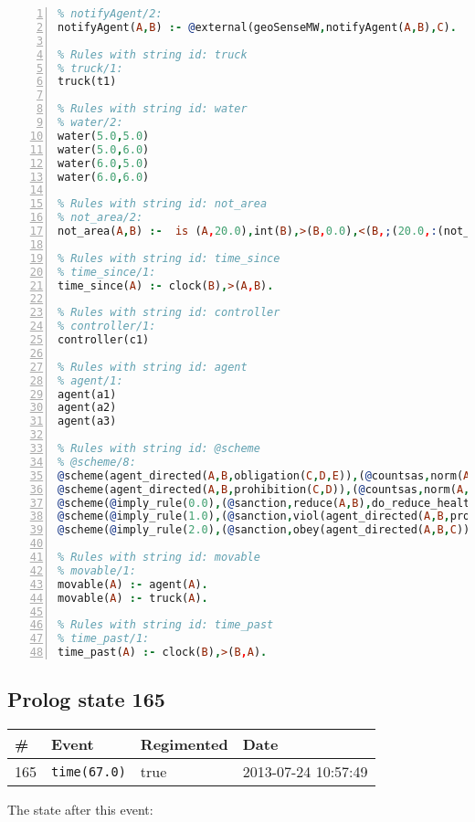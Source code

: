 \documentclass[11pt]{article}\usepackage[utf8]{inputenc}\usepackage{geometry}
\begin{document}
\begin{lstlisting}[language=Prolog, numbers=left]
% Rules with string id: notifyAgent
% notifyAgent/2:
notifyAgent(A,B) :- @external(geoSenseMW,notifyAgent(A,B),C).

% Rules with string id: truck
% truck/1:
truck(t1)

% Rules with string id: water
% water/2:
water(5.0,5.0)
water(5.0,6.0)
water(6.0,5.0)
water(6.0,6.0)

% Rules with string id: not_area
% not_area/2:
not_area(A,B) :-  is (A,20.0),int(B),>(B,0.0),<(B,;(20.0,:(not_area(A,B), is (-(B),20.0)))),int(A),>(A,0.0),<(A,;(20.0,:(area(A,B),-(int(A))))),int(B),>(A,0.0),>(B,0.0),<(A,21.0),<(B,21.0).

% Rules with string id: time_since
% time_since/1:
time_since(A) :- clock(B),>(A,B).

% Rules with string id: controller
% controller/1:
controller(c1)

% Rules with string id: agent
% agent/1:
agent(a1)
agent(a2)
agent(a3)

% Rules with string id: @scheme
% @scheme/8:
@scheme(agent_directed(A,B,obligation(C,D,E)),(@countsas,norm(A,B,F,obligation(C,D,E)),F),false,(listTrue(C)),(time_past(D)),false,[plus(viol(agent_directed(A,B,obligation(C,D,E))))|[]],[plus(obey(agent_directed(A,B,obligation(C,D,E))))|[]])
@scheme(agent_directed(A,B,prohibition(C,D)),(@countsas,norm(A,B,E,prohibition(C,D)),E),(listTrue(C)),false,(false),false,[plus(viol(agent_directed(A,B,prohibition(C,D))))|[]],[plus(obey(agent_directed(A,B,prohibition(C,D))))|[]])
@scheme(@imply_rule(0.0),(@sanction,reduce(A,B),do_reduce_health(A,B),notifyAgent(A,changed(status))),true,false,false,false,[min(reduce(A,B))|[]],[])
@scheme(@imply_rule(1.0),(@sanction,viol(agent_directed(A,B,prohibition(C,D))),do_sanction(D)),true,false,false,false,[min(viol(agent_directed(A,B,prohibition(C,D))))|[]],[])
@scheme(@imply_rule(2.0),(@sanction,obey(agent_directed(A,B,C))),true,false,false,false,[min(obey(agent_directed(A,B,C)))|[]],[])

% Rules with string id: movable
% movable/1:
movable(A) :- agent(A).
movable(A) :- truck(A).

% Rules with string id: time_past
% time_past/1:
time_past(A) :- clock(B),>(B,A).

\end{lstlisting}
\clearpage 
\subsection{Prolog state 165}
\begin{table}[ht]
\centering 
\begin{tabular}{l l l l} 
\textbf{\#} & \textbf{Event} & \textbf{Regimented} & \textbf{Date} \\ [0.5ex] 
\hline
165&\texttt{time(67.0)}&true&2013-07-24 10:57:49\\ [1ex] \hline\end{tabular}
\end{table}
The state after this event:
\end{document}
